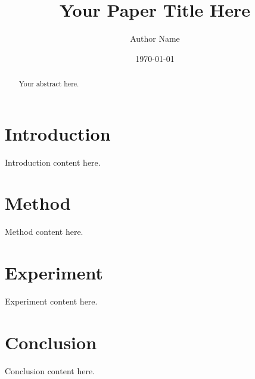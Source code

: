 \documentclass[12pt, a4paper]{article}
\title{Your Paper Title Here}
\author{Author Name}
\date{\today}
\begin{document}
\maketitle

\begin{abstract}
Your abstract here.
\end{abstract}

% 
% 
% 
% 

\section{Introduction}
Introduction content here.

\section{Method}
Method content here.

\section{Experiment}
Experiment content here.

\section{Conclusion}
Conclusion content here.



\end{document}
